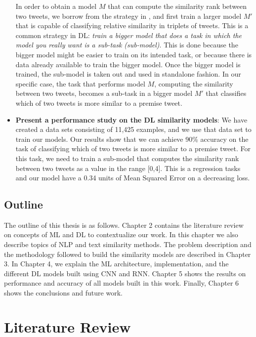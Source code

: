 \documentclass[12pt]{report}
\begin{document}
\begin{itemize}[nolistsep]
		In order to obtain a model $M$ that can compute the similarity rank between two tweets, we borrow from the strategy in \cite{Wang2014}, and first train a larger model $M'$
that is capable of classifying relative similarity in triplets of tweets. This is a common strategy in \ac{DL}: {\em train a bigger model that does a task in which the model you really want is  
	a sub-task (sub-model)}. This is done because the bigger model might be easier to train on its intended task, or because there is data already available to train the bigger model.  Once the bigger model is trained, the sub-model is taken out and used in standalone fashion. In our specific case, the task that performs model $M$, computing the similarity between two tweets, becomes a sub-task in a bigger
model $M'$ that classifies which of two tweets is more similar to a premise tweet.
		\item \textbf{Present a performance study on the DL similarity models}: We have created a data sets consisting of 11,425 examples, and we use that data set to train our models. Our results show that we can achieve 90\% accuracy on the task of classifying which of two tweets is more similar to a premise tweet.
		For this task, we need to train a sub-model that computes the similarity rank between two tweets as  a value in the range [0,4]. 
		This is a regression tasks and our model have a 0.34 units of Mean Squared Error on a decreasing loss.
	\end{itemize}
	
	\section{Outline}
	The outline of this thesis is as follows. Chapter 2 contains the literature review on concepts of \ac{ML} and \ac{DL} to contextualize our work. In this chapter we also describe topics of \ac{NLP} and text similarity methods. The problem description and the methodology followed to build the similarity models are described in Chapter 3. In Chapter 4, we explain the \ac{ML} architecture, implementation, and  the different \ac{DL} models built using \ac{CNN} and \ac{RNN}. Chapter 5 shows the results on performance and accuracy of all models built in this work. Finally, Chapter 6 shows the conclusions and future work.
	
	\onehalfspacing
	
	\chapter{Literature Review} \label{chapter 2}
\end{document}
